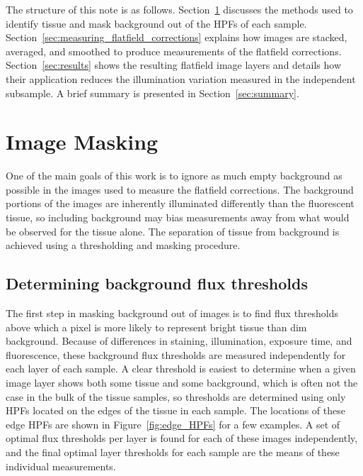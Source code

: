\documentclass[letterpaper,11pt]{article}
\newcommand{\reffig}[1]{Figure~\ref{#1}}
\newcommand{\refsec}[1]{Section~\ref{#1}}
\begin{document}
The structure of this note is as follows. \refsec{sec:image_masking} discusses the methods used to identify tissue and mask background out of the HPFs of each sample. \refsec{sec:measuring_flatfield_corrections} explains how images are stacked, averaged, and smoothed to produce measurements of the flatfield corrections. \refsec{sec:results} shows the resulting flatfield image layers and details how their application reduces the illumination variation measured in the independent subsample. A brief summary is presented in \refsec{sec:summary}.

\section{Image Masking}
\label{sec:image_masking}

One of the main goals of this work is to ignore as much empty background as possible in the images used to measure the flatfield corrections. The background portions of the images are inherently illuminated differently than the fluorescent tissue, so including background may bias measurements away from what would be observed for the tissue alone. The separation of tissue from background is achieved using a thresholding and masking procedure.

\subsection{Determining background flux thresholds}
\label{ssec:determining_background_flux_thresholds}

The first step in masking background out of images is to find flux thresholds above which a pixel is more likely to represent bright tissue than dim background. Because of differences in staining, illumination, exposure time, and fluorescence, these background flux thresholds are measured independently for each layer of each sample. A clear threshold is easiest to determine when a given image layer shows both some tissue and some background, which is often not the case in the bulk of the tissue samples, so thresholds are determined using only HPFs located on the edges of the tissue in each sample. The locations of these edge HPFs are shown in \reffig{fig:edge_HPFs} for a few examples. A set of optimal flux thresholds per layer is found for each of these images independently, and the final optimal layer thresholds for each sample are the means of these individual measurements.
\end{document}
